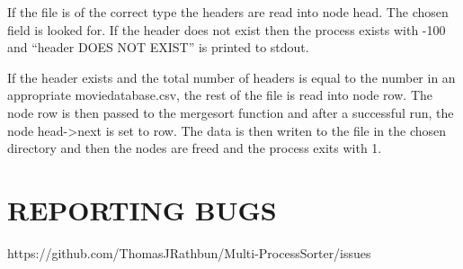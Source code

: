 \documentclass{article}
\begin{document}
\begin{center}
If the file is of the correct type the headers are read into node head. The chosen field is looked for. If the header does not exist then the process exists with -100 and ``header DOES NOT EXIST'' is printed to stdout.

If the header exists and the total number of headers is equal to the number in an appropriate moviedatabase.csv, the rest of the file is read into node row. The node row is then passed to the mergesort function and after a successful run, the node head->next is set to row. The data is then writen to the file in the chosen directory and then the nodes are freed and the process exits with 1.



\end{center}
\section{REPORTING BUGS}
\begin{center}
https://github.com/ThomasJRathbun/Multi-ProcessSorter/issues
\end{center}
\end{document}
